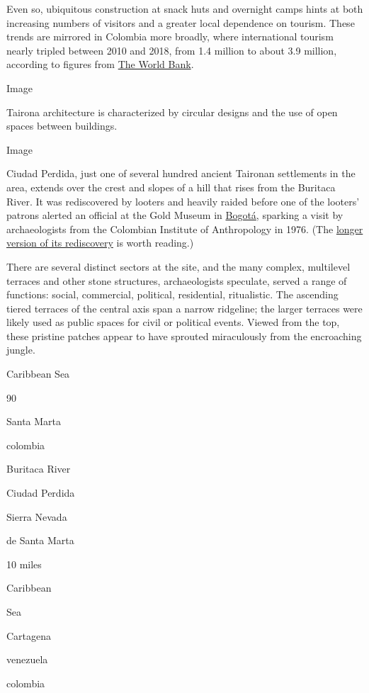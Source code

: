 Even so, ubiquitous construction at snack huts and overnight camps hints
at both increasing numbers of visitors and a greater local dependence on
tourism. These trends are mirrored in Colombia more broadly, where
international tourism nearly tripled between 2010 and 2018, from 1.4
million to about 3.9 million, according to figures from
\href{https://data.worldbank.org/indicator/ST.INT.ARVL?locations=CO}{The
World Bank}.

Image

Tairona architecture is characterized by circular designs and the use of
open spaces between buildings.

Image

Ciudad Perdida, just one of several hundred ancient Taironan settlements
in the area, extends over the crest and slopes of a hill that rises from
the Buritaca River. It was rediscovered by looters and heavily raided
before one of the looters' patrons alerted an official at the Gold
Museum in
\href{https://www.nytimes.com/2018/12/27/travel/what-to-do-in-bogota.html}{Bogotá},
sparking a visit by archaeologists from the Colombian Institute of
Anthropology in 1976. (The
\href{https://popular-archaeology.com/article/a-tale-of-cities-lost-and-found/}{longer
version of its rediscovery} is worth reading.)

There are several distinct sectors at the site, and the many complex,
multilevel terraces and other stone structures, archaeologists
speculate, served a range of functions: social, commercial, political,
residential, ritualistic. The ascending tiered terraces of the central
axis span a narrow ridgeline; the larger terraces were likely used as
public spaces for civil or political events. Viewed from the top, these
pristine patches appear to have sprouted miraculously from the
encroaching jungle.

Caribbean Sea

90

Santa Marta

colombia

Buritaca River

Ciudad Perdida

Sierra Nevada

de Santa Marta

10 miles

Caribbean

Sea

Cartagena

venezuela

colombia

